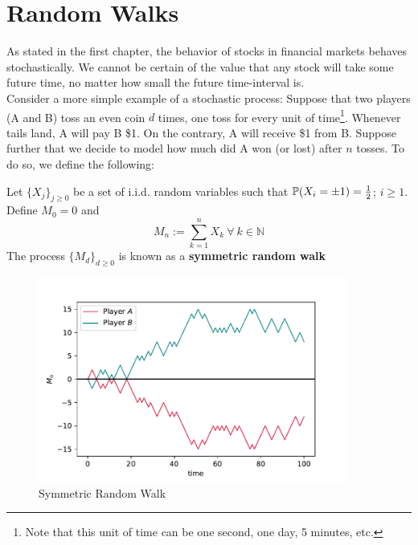\documentclass[../TGMAFFIRO]{subfiles}
\begin{document}
	



\section{Random Walks}
As stated in the first chapter, the behavior of stocks in financial markets behaves stochastically. We cannot be certain of the value that any stock will take some future time, no matter how small the future time-interval is.\\

Consider a more simple example of a stochastic process: Suppose that two players (A and B) toss an even coin $d$ times, one toss for every unit of time\footnote{Note that this unit of time can be one second, one day, 5 minutes, etc.}. Whenever tails land, A will pay B \$1. On the contrary, A will receive \$1 from B. Suppose further that we decide to model how much did A won (or lost) after $n$ tosses. To do so, we define the following:

\begin{definition}\label{srwalk}
	Let $\{X_j\}_{j\geq0}$ be a set of i.i.d. random variables such that $\mathbb{P}(X_i = \pm 1) = \frac{1}{2}$; $i \geq 1$. Define $M_0 = 0$ and
	\[M_n := \sum_{k=1}^n X_k \ \forall \ k \in \mathbb{N}\] 
	The process $\{M_d\}_{d\geq 0}$ is known as a \textbf{symmetric random walk}
\end{definition}

\begin{figure}
	\label{fig:symmetric_random_walk}
	\centering
	\includegraphics[width=0.9\textwidth]{images/symmetric_random_walk}
	\caption{Symmetric Random Walk}
\end{figure}
\end{document}
